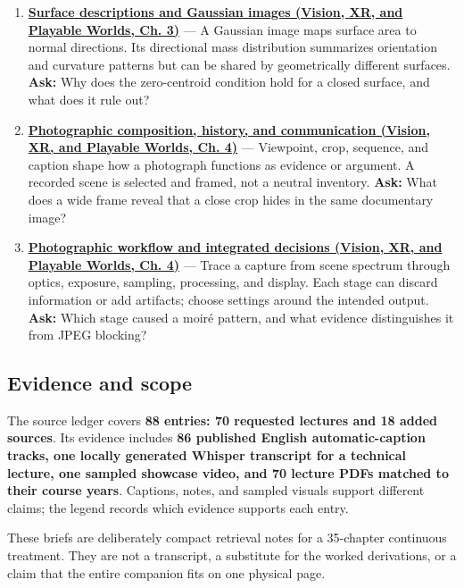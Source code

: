 \begin{enumerate}
\item
  \textbf{\href{../07-Vision-XR-and-Playable-Worlds/main.pdf\#nameddest=04-visual-computing-ii-ch032-surface-descriptions-and-gaussian-images}{Surface descriptions and Gaussian images (Vision, XR, and Playable Worlds, Ch. 3)}} --- A Gaussian image maps surface area to normal directions. Its directional mass distribution summarizes orientation and curvature patterns but can be shared by geometrically different surfaces. \textbf{Ask:} Why does the zero-centroid condition hold for a closed surface, and what does it rule out?
\item
  \textbf{\href{../07-Vision-XR-and-Playable-Worlds/main.pdf\#nameddest=04-visual-computing-ii-ch034-photographic-composition-history-and-communication}{Photographic composition, history, and communication (Vision, XR, and Playable Worlds, Ch. 4)}} --- Viewpoint, crop, sequence, and caption shape how a photograph functions as evidence or argument. A recorded scene is selected and framed, not a neutral inventory. \textbf{Ask:} What does a wide frame reveal that a close crop hides in the same documentary image?
\item
  \textbf{\href{../07-Vision-XR-and-Playable-Worlds/main.pdf\#nameddest=04-visual-computing-ii-ch034-photographic-workflow-and-integrated-decisions}{Photographic workflow and integrated decisions (Vision, XR, and Playable Worlds, Ch. 4)}} --- Trace a capture from scene spectrum through optics, exposure, sampling, processing, and display. Each stage can discard information or add artifacts; choose settings around the intended output. \textbf{Ask:} Which stage caused a moiré pattern, and what evidence distinguishes it from JPEG blocking?
\end{enumerate}

\subsection{Evidence and scope}\label{appendix-a8f634b076b5-evidence-and-scope}

The source ledger covers \textbf{88 entries: 70 requested lectures and 18 added sources}. Its evidence includes \textbf{86 published English automatic-caption tracks, one locally generated Whisper transcript for a technical lecture, one sampled showcase video, and 70 lecture PDFs matched to their course years}. Captions, notes, and sampled visuals support different claims; the legend records which evidence supports each entry.

These briefs are deliberately compact retrieval notes for a 35-chapter continuous treatment. They are not a transcript, a substitute for the worked derivations, or a claim that the entire companion fits on one physical page.

